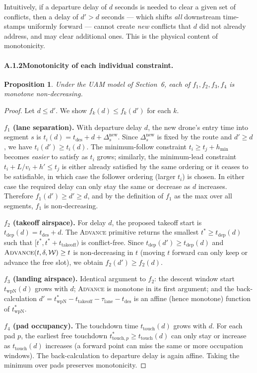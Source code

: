 \documentclass[12pt,a4paper]{article}
\newtheorem{proposition}[theorem]{Proposition}
\newcommand{\twpN}{t_{\mathrm{wpN}}}
\newcommand{\ttouch}{t_{\mathrm{touch}}}
\newcommand{\tto}{t_{\mathrm{takeoff}}}
\newcommand{\lane}{\tau_{\mathrm{lane}}}
\begin{document}
Intuitively, if a departure delay of $d$ seconds is needed to clear a
given set of conflicts, then a delay of $d' > d$ seconds — which shifts
\emph{all} downstream time-stamps uniformly forward — cannot create
\emph{new} conflicts that $d$ did not already address, and may clear
additional ones.  This is the physical content of monotonicity.

\paragraph{A.1.2\quad Monotonicity of each individual constraint.}

\begin{proposition}
Under the UAM model of Section~6, each of $f_1, f_2, f_3, f_4$ is
monotone non-decreasing.
\end{proposition}

\begin{proof}
Let $d \le d'$.  We show $f_k(d) \le f_k(d')$ for each $k$.

\smallskip
\textbf{$f_1$ (lane separation).}
With departure delay $d$, the new drone's entry time into segment $s$ is
$t_i(d) = t_{\mathrm{des}} + d + \Delta_s^{\mathrm{new}}$.
Since $\Delta_s^{\mathrm{new}}$ is fixed by the route and $d' \ge d$,
we have $t_i(d') \ge t_i(d)$.
The minimum-follow constraint $t_i \ge t_j + h_{\min}$ becomes
\emph{easier} to satisfy as $t_i$ grows; similarly, the minimum-lead
constraint $t_i + L/v_i + h' \le t_j$ is either already satisfied by
the same ordering or it ceases to be satisfiable, in which case the
follower ordering (larger $t_i$) is chosen.
In either case the required delay can only stay the same or decrease as
$d$ increases.
Therefore $f_1(d') \ge d' \ge d$, and by the definition of $f_1$ as
the max over all segments, $f_1$ is non-decreasing.

\smallskip
\textbf{$f_2$ (takeoff airspace).}
For delay $d$, the proposed takeoff start is $t_{\mathrm{dep}}(d) =
t_{\mathrm{des}} + d$.
The \textsc{Advance} primitive returns the smallest $t^* \ge
t_{\mathrm{dep}}(d)$ such that $[t^*, t^*+\tto)$ is conflict-free.
Since $t_{\mathrm{dep}}(d') \ge t_{\mathrm{dep}}(d)$ and
$\textsc{Advance}(t, \delta, \mathcal{W}) \ge t$ is non-decreasing in
$t$ (moving $t$ forward can only keep or advance the free slot), we
obtain $f_2(d') \ge f_2(d)$.

\smallskip
\textbf{$f_3$ (landing airspace).}
Identical argument to $f_2$: the descent window start $\twpN(d)$ grows
with $d$; \textsc{Advance} is monotone in its first argument; and the
back-calculation $d' = \twpN^* - \tto - \lane - t_{\mathrm{des}}$ is
an affine (hence monotone) function of $\twpN^*$.

\smallskip
\textbf{$f_4$ (pad occupancy).}
The touchdown time $\ttouch(d)$ grows with $d$.  For each pad $p$, the
earliest free touchdown $t^*_{\mathrm{touch},p} \ge \ttouch(d)$ can only stay or
increase as $\ttouch(d)$ increases (a forward point can miss the same
or more occupation windows).  The back-calculation to departure delay is
again affine.  Taking the minimum over pads preserves monotonicity.
\end{proof}
\end{document}
